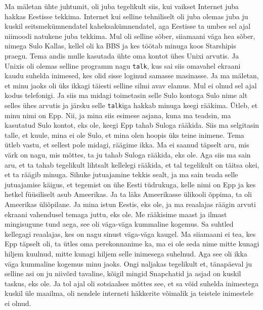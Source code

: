 Ma mäletan ühte juhtumit,  oli juba tegelikult siis, kui vaikset Internet juba 
hakkas Eestisse tekkima. Internet kui selline tehniliselt oli juba olemas juba 
ju kuskil seitsmekümnendatel kaheksakümnendatel, aga  Eestisse  ta umbes sel 
ajal niimoodi natukene juba tekkima. Mul oli selline sõber, siiamaani väga hea 
sõber, nimega Sulo Kallas, kellel oli ka BBS ja kes 
töötab minuga koos Starshipis praegu. Tema andis 
mulle kasutada ühte oma kontot ühes Unixi arvutis. Ja Unixis oli olemas selline 
programm nagu \verb|talk|, kus sai siis omavahel ekraani kaudu suhelda 
inimesed, kes olid sisse loginud samasse masinasse. Ja ma mäletan, et  minu 
jaoks oli üks ikkagi täiesti selline silmi avav  elamus.  Mul ei olnud sel ajal 
kodus telefonigi. Ja siis ma midagi toimetasin selle Sulo kontoga Sulo nime alt 
selles ühes arvutis ja järsku selle \verb|talk|iga  hakkab minuga keegi 
rääkima.  Ütleb, et minu nimi on Epp. Nii, ja mina siis esimese asjana, kuna ma 
teadsin, ma kasutatud Sulo kontot, eks ole, keegi Epp tahab Suloga rääkida. 
Siis ma selgitasin talle, et kuule, mina ei ole Sulo, et mina olen hoopis üks 
teine inimene. Tema ütleb vastu, et  sellest pole midagi, räägime ikka. Ma ei 
saanud täpselt aru, mis värk on nagu, mis mõttes, ta ju tahab Suloga rääkida, 
eks ole. Aga siis ma sain aru, et ta tahab tegelikult lihtsalt kellelegi 
rääkida, et tal  tegelikult on täitsa okei, et ta räägib  minuga. Sihuke 
jutuajamine tekkis sealt, ja ma sain teada selle jutuajamise käigus, et  
tegemist on ühe Eesti tüdrukuga, kelle nimi on Epp ja kes hetkel füüsiliselt 
asub Ameerikas. Ja ta läks Ameerikasse  ülikooli õppima, ta oli Ameerikas 
üliõpilane. Ja mina istun Eestis, eks ole, ja ma reaalajas räägin arvuti 
ekraani vahendusel  temaga juttu, eks ole. Me rääkisime maast ja ilmast 
mingisugune tund aega, see oli  väga-väga kummaline kogemus. Sa  suhtled 
kellegagi reaalajas, kes on nagu sinust väga-väga kaugel. Ma siiamaani ei tea, 
kes Epp täpselt oli, ta ütles oma perekonnanime ka, ma ei ole seda nime mitte 
kunagi hiljem kuulnud, mitte kunagi hiljem selle inimesega suhelnud. Aga see 
oli ikka väga kummaline kogemus minu jaoks. Ongi naljakas tegelikult et, 
tänapäeval ju selline asi on ju niivõrd tavaline, kõigil mingid Snapchatid ja 
asjad on kuskil taskus, eks ole. Ja tol ajal oli sotsiaalses mõttes see, et sa 
võid suhelda inimestega kuskil üle maailma,  oli nendele interneti häkkerite 
võimalik ja teistele inimestele ei olnud.


